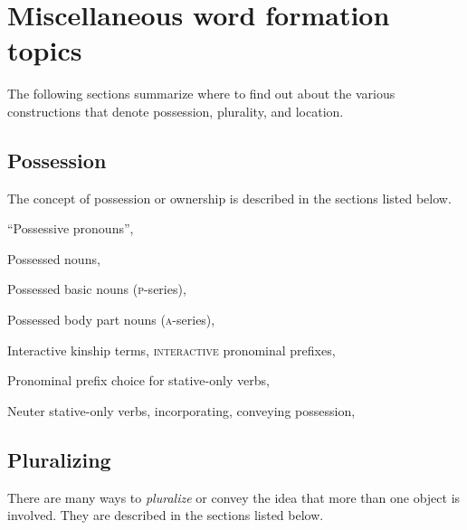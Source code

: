 \chapter{Miscellaneous word formation topics} \label{ch:Miscellaneous word formation topics}
The following sections summarize where to find out about the various constructions that denote possession, plurality, and location.


\section{Possession} \label{ch:Possession}
The concept of possession or ownership is described in the sections listed below.

\begin{CayugaRelated}
\item “Possessive pronouns”, 

\item Possessed nouns, 

\item Possessed basic nouns (\textsc{p}-series), 

\item Possessed body part nouns (\textsc{a}-series), 

\item Interactive kinship terms, \textsc{interactive} pronominal prefixes, 

\item Pronominal prefix choice for stative-only verbs, 

\item Neuter stative-only verbs, incorporating, conveying possession, 
\end{CayugaRelated}



\section{Pluralizing} \label{ch:Pluralizing}
There are many ways to \emph{pluralize} or convey the idea that more than one object is involved. They are described in the sections listed below.

